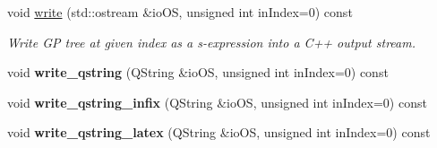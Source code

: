 \begin{DoxyCompactItemize}
void \hyperlink{classPuppy_1_1Tree_ae7cf5b8e64273dc265a2e751f4a06ffb}{write} (std\+::ostream \&io\+O\+S, unsigned int in\+Index=0) const 
\begin{DoxyCompactList}\small\item\em Write G\+P tree at given index as a s-\/expression into a C++ output stream. \end{DoxyCompactList}\item 
\hypertarget{classPuppy_1_1Tree_a7b051f1143713fb9dc754abaa995fa05}{}void {\bfseries write\+\_\+qstring} (Q\+String \&io\+O\+S, unsigned int in\+Index=0) const \label{classPuppy_1_1Tree_a7b051f1143713fb9dc754abaa995fa05}

\item 
\hypertarget{classPuppy_1_1Tree_a0efdb3778f18a4aec63d9482aeb7ad55}{}void {\bfseries write\+\_\+qstring\+\_\+infix} (Q\+String \&io\+O\+S, unsigned int in\+Index=0) const \label{classPuppy_1_1Tree_a0efdb3778f18a4aec63d9482aeb7ad55}

\item 
\hypertarget{classPuppy_1_1Tree_aa464eae9cf144f8525320f23d00a8172}{}void {\bfseries write\+\_\+qstring\+\_\+latex} (Q\+String \&io\+O\+S, unsigned int in\+Index=0) const \label{classPuppy_1_1Tree_aa464eae9cf144f8525320f23d00a8172}

\end{DoxyCompactItemize}
